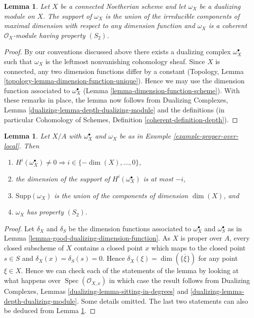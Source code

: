 \documentclass{stacks-project}
\theoremstyle{plain}
\newtheorem{lemma}[subsection]{Lemma}
\theoremstyle{definition}
\theoremstyle{remark}
\numberwithin{equation}{subsection}
\def\Spec{\mathop{\mathrm{Spec}}}
\begin{document}
\begin{lemma}
\label{lemma-dualizing-module}
Let $X$ be a connected Noetherian scheme and let $\omega_X$ be a dualizing
module on $X$. The support of $\omega_X$ is the union of the irreducible
components of maximal dimension with respect to any dimension function
and $\omega_X$ is a coherent $\mathcal{O}_X$-module having property $(S_2)$.
\end{lemma}

\begin{proof}
By our conventions discussed above there exists a dualizing complex
$\omega_X^\bullet$ such that $\omega_X$ is the leftmost nonvanishing
cohomology sheaf. Since $X$ is connected, any two dimension functions
differ by a constant
(Topology, Lemma \ref{topology-lemma-dimension-function-unique}).
Hence we may use the
dimension function associated to $\omega_X^\bullet$
(Lemma \ref{lemma-dimension-function-scheme}).
With these remarks in place, the lemma now
follows from Dualizing Complexes, Lemma
\ref{dualizing-lemma-depth-dualizing-module}
and the definitions (in particular
Cohomology of Schemes, Definition \ref{coherent-definition-depth}).
\end{proof}

\begin{lemma}
\label{lemma-vanishing-good-dualizing}
Let $X/A$ with $\omega_X^\bullet$ and $\omega_X$ be as in
Example \ref{example-proper-over-local}. Then
\begin{enumerate}
\item $H^i(\omega_X^\bullet) \not = 0 \Rightarrow
i \in \{-\dim(X), \ldots, 0\}$,
\item the dimension of the support of $H^i(\omega_X^\bullet)$ is at most $-i$,
\item $\text{Supp}(\omega_X)$ is the union of
the components of dimension $\dim(X)$, and
\item $\omega_X$ has property $(S_2)$.
\end{enumerate}
\end{lemma}

\begin{proof}
Let $\delta_X$ and $\delta_S$ be the dimension functions associated to
$\omega_X^\bullet$ and $\omega_S^\bullet$ as in
Lemma \ref{lemma-good-dualizing-dimension-function}.
As $X$ is proper over $A$, every closed subscheme of $X$ contains
a closed point $x$ which maps to the closed point $s \in S$
and $\delta_X(x) = \delta_S(s) = 0$. Hence
$\delta_X(\xi) = \dim(\overline{\{\xi\}})$ for any point
$\xi \in X$. Hence we can check each of
the statements of the lemma by looking at what happens over
$\Spec(\mathcal{O}_{X, x})$ in which case the result follows
from Dualizing Complexes, Lemmas \ref{dualizing-lemma-sitting-in-degrees} and
\ref{dualizing-lemma-depth-dualizing-module}.
Some details omitted.
The last two statements can also be deduced from
Lemma \ref{lemma-dualizing-module}.
\end{proof}
\end{document}
